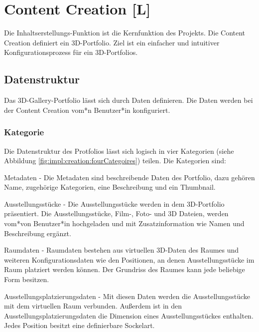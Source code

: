 \section{Content Creation [L]}
Die Inhaltserstellungs-Funktion ist die Kernfunktion des Projekts. Die Content Creation definiert ein 3D-Portfolio. Ziel ist ein einfacher und intuitiver Konfigurationsprozess für ein 3D-Portfolios. 

\subsection{Datenstruktur}
Das 3D-Gallery-Portfolio lässt sich durch Daten definieren. Die Daten werden bei der Content Creation vom*n Benutzer*in konfiguriert. 

\subsubsection{Kategorie}
Die Datenstruktur des Protfolios lässt sich logisch in vier Kategorien (siehe Abbildung \ref{fig:impl:creation:fourCategoires}) teilen. 
Die Kategorien sind:
\begin{compactitem}
\item Metadaten - Die Metadaten sind beschreibende Daten des Portfolio, dazu gehören Name, zugehörige Kategorien, eine Beschreibung und ein Thumbnail.
\item Ausstellungsstücke - Die Ausstellungsstücke werden in dem 3D-Portfolio präsentiert. Die Ausstellungsstücke, Film-, Foto- und 3D Dateien,  werden vom*von Benutzer*in hochgeladen und mit Zusatzinformation wie Namen und Beschreibung ergänzt. 
\item Raumdaten - Raumdaten bestehen aus virtuellen 3D-Daten des Raumes und weiteren Konfigurationsdaten wie den Positionen, an denen Ausstellungsstücke im Raum platziert werden können. Der Grundriss des Raumes kann jede beliebige Form besitzen. 
\item Ausstellungsplatzierungsdaten - Mit diesen Daten werden die Ausstellungsstücke mit dem virtuellen Raum verbunden. Außerdem ist in den Ausstellungsplatzierungsdaten die Dimension eines Ausstellungsstückes enthalten. Jedes Position besitzt eine definierbare Sockelart. 
\end{compactitem}

